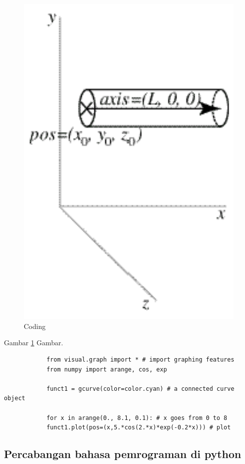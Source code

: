 		\begin{figure}[ht]
					\centerline{\includegraphics[width=1\textwidth]{figures/OSS.jpg}}
				\caption{Coding}
			\label{Vphython}
		\end{figure}
	Gambar \ref{Vphython} Gambar.
		\begin{verbatim}
			from visual.graph import * # import graphing features
			from numpy import arange, cos, exp

			funct1 = gcurve(color=color.cyan) # a connected curve object

			for x in arange(0., 8.1, 0.1): # x goes from 0 to 8
			funct1.plot(pos=(x,5.*cos(2.*x)*exp(-0.2*x))) # plot
		\end{verbatim}
		\subsection{Percabangan bahasa pemrograman di python}
		 
